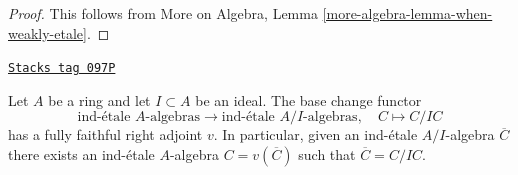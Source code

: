 \begin{proof}
This follows from More on Algebra, Lemma
\ref{more-algebra-lemma-when-weakly-etale}.
\end{proof}

\begin{lemma}
\label{proetale-lemma-lift-ind-etale}
\href{https://stacks.math.columbia.edu/tag/097P}{\texttt{Stacks tag 097P}}

Let $A$ be a ring and let $I \subset A$ be an ideal. The base change functor
$$
\text{ind-\'etale }A\text{-algebras}
\longrightarrow
\text{ind-\'etale }A/I\text{-algebras},\quad
C \longmapsto C/IC
$$
has a fully faithful right adjoint $v$. In particular, given
an ind-\'etale $A/I$-algebra $\overline{C}$ there exists
an ind-\'etale $A$-algebra $C = v(\overline{C})$ such that
$\overline{C} = C/IC$.
\end{lemma}

